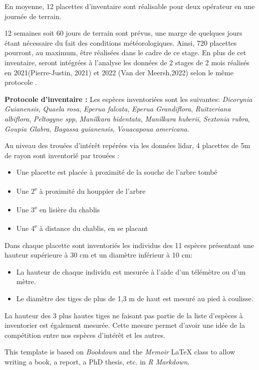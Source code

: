\documentclass[
  12pt,
  american,
  a4paper,
  extrafontsizes,onecolumn,openright
  ]{memoir}
\begin{document}
En moyenne, 12 placettes d'inventaire sont réalisable pour deux opérateur en une journée de terrain.

12 semaines soit 60 jours de terrain sont prévus, une marge de quelques jours étant nécessaire du fait des conditions météorologiques. Ainsi, 720 placettes pourront, au maximum, être réalisées dans le cadre de ce stage. En plus de cet inventaire, seront intégrées à l'analyse les données de 2 stages de 2 mois réalisés en 2021(Pierre-Justin, 2021) et 2022 (Van der Meersh,2022) selon le même protocole .

\textbf{Protocole d'inventaire :}
Les espèces inventoriées sont les suivantes: \emph{Dicorynia Guianensis}, \emph{Quaela rosa}, \emph{Eperua falcata}, \emph{Eperua Grandiflora}, \emph{Ruitzeriana albiflora}, \emph{Peltogyne spp}, \emph{Manilkara bidentata}, \emph{Manilkara huberii}, \emph{Sextonia rubra}, \emph{Goupia Glabra}, \emph{Bagassa guianensis}, \emph{Vouacapoua americana}.

Au niveau des trouées d'intérêt repérées via les données lidar, 4 placettes de 5m de rayon sont inventorié par trouées :

\begin{itemize}
\item
  Une placette est placée à proximité de la souche de l'arbre tombé
\item
  Une 2\textsuperscript{e} à proximité du houppier de l'arbre
\item
  Une 3\textsuperscript{e} en lisière du chablis
\item
  Une 4\textsuperscript{e} à distance du chablis, en se placant
\end{itemize}

Dans chaque placette sont inventoriés les individus des 11 espèces présentant une hauteur supérieure à 30 cm et un diamètre inférieur à 10 cm:

\begin{itemize}
\item
  La hauteur de chaque individu est mesurée à l'aide d'un télémètre ou d'un mètre.
\item
  Le diamètre des tiges de plus de 1,3 m de haut est mesuré au pied à coulisse.
\end{itemize}

La hauteur des 3 plus hautes tiges ne faisant pas partie de la liste d'espèces à inventorier est également mesurée. Cette mesure permet d'avoir une idée de la compétition entre nos espèces d'intérêt et les autres.

This template is based on \emph{Bookdown} and the \emph{Memoir} LaTeX class to allow writing a book, a report, a PhD thesis, etc. in \emph{R Markdown}.
\end{document}
